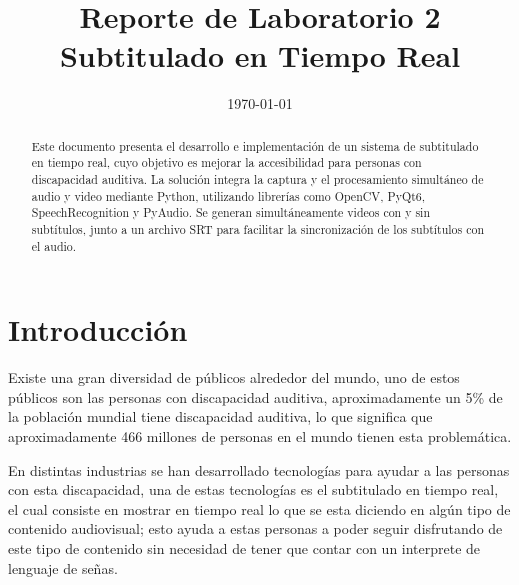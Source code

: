 \documentclass[conference]{IEEEtran}
\date{\specialdate\today}
\begin{document}
\newcommand{\breite}{0.9} %
\newcommand{\RelacionFiguradoscolumnas}{0.9}
\newcommand{\RelacionFiguradoscolumnasPuntoCinco}{0.45}

\title{Reporte de Laboratorio 2 \\ Subtitulado en Tiempo Real}

\author{
}

\maketitle

\begin{abstract}
Este documento presenta el desarrollo e implementación de un sistema de subtitulado en tiempo real, cuyo objetivo es mejorar la accesibilidad para personas con discapacidad auditiva. La solución integra la captura y el procesamiento simultáneo de audio y video mediante Python, utilizando librerías como OpenCV, PyQt6, SpeechRecognition y PyAudio. Se generan simultáneamente videos con y sin subtítulos, junto a un archivo SRT para facilitar la sincronización de los subtítulos con el audio.
\end{abstract}

\section{Introducción}
Existe una gran diversidad de públicos alrededor del mundo, uno de estos públicos son las personas con discapacidad auditiva, aproximadamente un 5\% de la población mundial tiene discapacidad auditiva, lo que significa que aproximadamente 466 millones de personas en el mundo tienen esta problemática. \cite{OMS}

En distintas industrias se han desarrollado tecnologías para ayudar a las personas con esta discapacidad, una de estas tecnologías es el subtitulado en tiempo real, el cual consiste en mostrar en tiempo real lo que se esta diciendo en algún tipo de contenido audiovisual; esto ayuda a estas personas a poder seguir disfrutando de este tipo de contenido sin necesidad de tener que contar con un interprete de lenguaje de señas.
\end{document}

